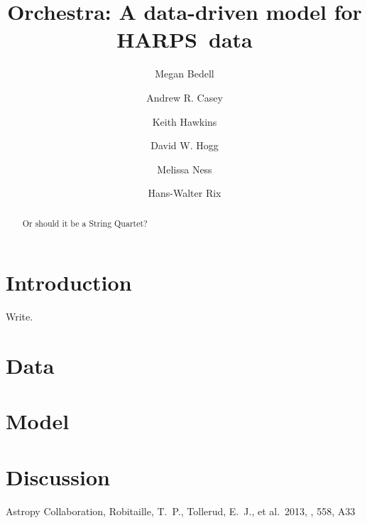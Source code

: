 \documentclass{aastex61}
\newcommand{\acronym}[1]{{\small{#1}}}
\newcommand{\harps}{\acronym{HARPS}}
\begin{document}
\title{Orchestra: A data-driven model for \harps\ data}

\author{Megan Bedell}
\author[0000-0003-0174-0564]{Andrew R. Casey}
\author{Keith Hawkins}
\author{David W. Hogg}
\author{Melissa Ness}
\author{Hans-Walter Rix}



\begin{abstract}
Or should it be a String Quartet?
\end{abstract}

\keywords{}

\section{Introduction} 
\label{sec:introduction}
Write.


\section{Data}
\label{sec:observations}


\section{Model}
\label{sec:model}



\section{Discussion}
\label{sec:discussion}


\acknowledgments



\begin{thebibliography}{}

 Astropy Collaboration, Robitaille, T.~P., Tollerud, E.~J., et al.\ 2013, \aap, 558, A33 

\end{thebibliography}
\end{document}
